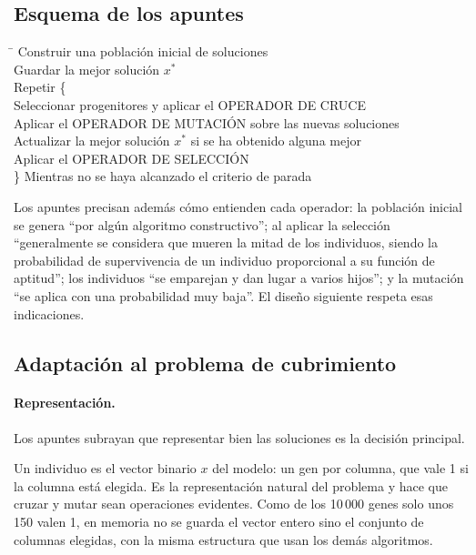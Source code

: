 \subsection{Esquema de los apuntes}

\begin{apuntes}
\begin{tabbing}
\quad\=\kill
Construir una población inicial de soluciones\\
Guardar la mejor solución $x^\ast$\\
Repetir \{\\
\> Seleccionar progenitores y aplicar el OPERADOR DE CRUCE\\
\> Aplicar el OPERADOR DE MUTACIÓN sobre las nuevas soluciones\\
\> Actualizar la mejor solución $x^\ast$ si se ha obtenido alguna mejor\\
\> Aplicar el OPERADOR DE SELECCIÓN\\
\} Mientras no se haya alcanzado el criterio de parada
\end{tabbing}
\end{apuntes}

Los apuntes precisan además cómo entienden cada operador: la población inicial se genera
``por algún algoritmo constructivo''; al aplicar la selección ``generalmente se considera que
mueren la mitad de los individuos, siendo la probabilidad de supervivencia de un individuo
proporcional a su función de aptitud''; los individuos ``se emparejan y dan lugar a varios
hijos''; y la mutación ``se aplica con una probabilidad muy baja''. El diseño siguiente
respeta esas indicaciones.

\subsection{Adaptación al problema de cubrimiento}

\paragraph{Representación.} Los apuntes subrayan que representar bien las soluciones es la
decisión principal.

\begin{decision}
Un individuo es el vector binario $x$ del modelo: un gen por columna, que vale 1 si la
columna está elegida. Es la representación natural del problema y hace que cruzar y mutar
sean operaciones evidentes. Como de los 10\,000 genes solo unos 150 valen 1, en memoria no
se guarda el vector entero sino el conjunto de columnas elegidas, con la misma estructura
 que usan los demás algoritmos.
\end{decision}

